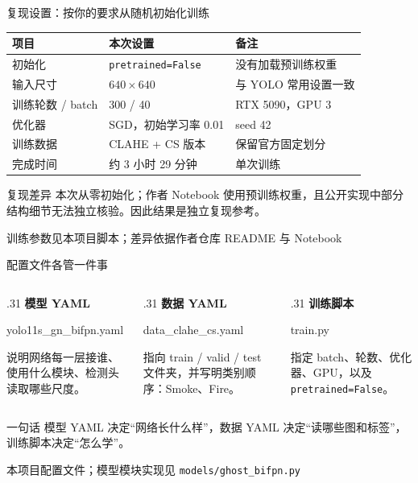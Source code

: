 \documentclass[aspectratio=169,10pt]{ctexbeamer}
\newcommand{\paperref}[1]{\par\vfill{\raggedleft\scriptsize\textcolor{neutral}{#1}\par}}
\begin{document}
\begin{frame}{复现设置：按你的要求从随机初始化训练}
  \small
  \renewcommand{\arraystretch}{1.22}
  \begin{tabularx}{\linewidth}{p{2.45cm}X p{2.9cm}}
    \toprule
    项目 & 本次设置 & 备注\\
    \midrule
    初始化 & \texttt{pretrained=False} & 没有加载预训练权重\\
    输入尺寸 & $640\times640$ & 与 YOLO 常用设置一致\\
    训练轮数 / batch & 300 / 40 & RTX 5090，GPU 3\\
    优化器 & SGD，初始学习率 0.01 & seed 42\\
    训练数据 & CLAHE + CS 版本 & 保留官方固定划分\\
    完成时间 & 约 3 小时 29 分钟 & 单次训练\\
    \bottomrule
  \end{tabularx}
  \vspace{.18cm}
  \begin{alertblock}{复现差异}
    本次从零初始化；作者 Notebook 使用预训练权重，且公开实现中部分结构细节无法独立核验。因此结果是独立复现参考。
  \end{alertblock}
  \paperref{训练参数见本项目脚本；差异依据作者仓库 README 与 Notebook}
\end{frame}

\begin{frame}{配置文件各管一件事}
  \begin{columns}[T,onlytextwidth]
    \begin{column}{.31\textwidth}
      \textbf{模型 YAML}\par\medskip
      {\ttfamily\small yolo11s\_gn\_bifpn.yaml}\par\medskip
      说明网络每一层接谁、使用什么模块、检测头读取哪些尺度。
    \end{column}
    \begin{column}{.31\textwidth}
      \textbf{数据 YAML}\par\medskip
      {\ttfamily\small data\_clahe\_cs.yaml}\par\medskip
      指向 train / valid / test 文件夹，并写明类别顺序：Smoke、Fire。
    \end{column}
    \begin{column}{.31\textwidth}
      \textbf{训练脚本}\par\medskip
      {\ttfamily\small train.py}\par\medskip
      指定 batch、轮数、优化器、GPU，以及 \texttt{pretrained=False}。
    \end{column}
  \end{columns}
  \vspace{.4cm}
  \begin{block}{一句话}
    模型 YAML 决定“网络长什么样”，数据 YAML 决定“读哪些图和标签”，训练脚本决定“怎么学”。
  \end{block}
  \paperref{本项目配置文件；模型模块实现见 \texttt{models/ghost\_bifpn.py}}
\end{frame}
\end{document}
